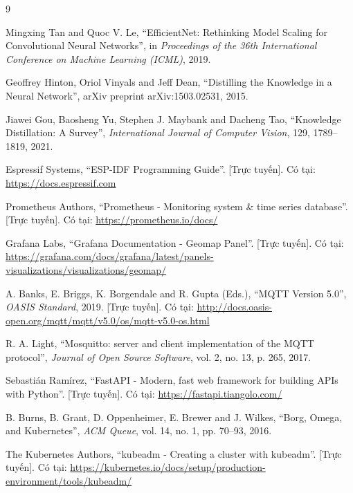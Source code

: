 \documentclass[12pt,a4paper]{report}
\begin{document}
\begin{thebibliography}{9}

Mingxing Tan and Quoc V. Le,
``EfficientNet: Rethinking Model Scaling for Convolutional Neural Networks'',
in \emph{Proceedings of the 36th International Conference on Machine Learning (ICML)}, 2019.

Geoffrey Hinton, Oriol Vinyals and Jeff Dean,
``Distilling the Knowledge in a Neural Network'',
arXiv preprint arXiv:1503.02531, 2015.

Jiawei Gou, Baosheng Yu, Stephen J. Maybank and Dacheng Tao,
``Knowledge Distillation: A Survey'',
\emph{International Journal of Computer Vision}, 129, 1789--1819, 2021.

Espressif Systems,
``ESP-IDF Programming Guide''.
[Trực tuyến]. Có tại: \url{https://docs.espressif.com}

Prometheus Authors,
``Prometheus - Monitoring system \& time series database''.
[Trực tuyến]. Có tại: \url{https://prometheus.io/docs/}

Grafana Labs,
``Grafana Documentation - Geomap Panel''.
[Trực tuyến]. Có tại: \url{https://grafana.com/docs/grafana/latest/panels-visualizations/visualizations/geomap/}

A. Banks, E. Briggs, K. Borgendale and R. Gupta (Eds.),
``MQTT Version 5.0'',
\emph{OASIS Standard}, 2019. [Trực tuyến]. Có tại: \url{http://docs.oasis-open.org/mqtt/mqtt/v5.0/os/mqtt-v5.0-os.html}

R. A. Light,
``Mosquitto: server and client implementation of the MQTT protocol'',
\emph{Journal of Open Source Software}, vol. 2, no. 13, p. 265, 2017.

Sebastián Ramírez,
``FastAPI - Modern, fast web framework for building APIs with Python''.
[Trực tuyến]. Có tại: \url{https://fastapi.tiangolo.com/}

B. Burns, B. Grant, D. Oppenheimer, E. Brewer and J. Wilkes,
``Borg, Omega, and Kubernetes'',
\emph{ACM Queue}, vol. 14, no. 1, pp. 70--93, 2016.

The Kubernetes Authors,
``kubeadm - Creating a cluster with kubeadm''.
[Trực tuyến]. Có tại: \url{https://kubernetes.io/docs/setup/production-environment/tools/kubeadm/}


\end{thebibliography}
\end{document}

